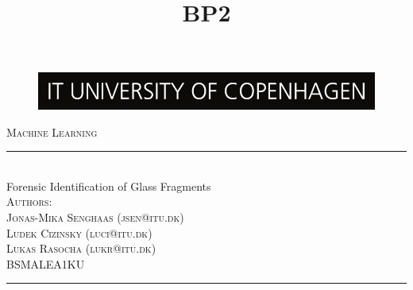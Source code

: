 \title{BP2}
\begin{titlepage}
\centering
\newcommand{\HRule}{\rule{\linewidth}{0.5mm}}
\begin{figure}[h]
\centering
\includegraphics[width=12cm]{figures/ITU_logo_UK_800x88 jpg.jpg}
\end{figure}
\hfill \break
\hfill \break
\textsc{\Large Machine Learning}\\[0.6cm] 
\HRule \\[0.4cm]
\linespread{1.0}
\huge Forensic Identification of Glass Fragments
\\[0.5cm] 
\vspace*{.5cm}
\textsc{\large Authors: \\Jonas-Mika Senghaas (jsen@itu.dk) \\Ludek Cizinsky (luci@itu.dk) \\Lukas Rasocha (lukr@itu.dk)\\ BSMALEA1KU}\\[0.4cm]

\HRule \\[1.5cm] 

\begin{minipage}{0.45\textwidth}
\begin{flushleft} \large

\end{flushleft}
\end{minipage}
~
\begin{minipage}{0.5\textwidth}
\begin{flushright} \large


\end{flushright}
\end{minipage}

 \vfill 
\end{titlepage}

\pagebreak